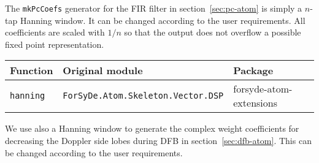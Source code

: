 \documentclass[
  a4paper,
]{article}
\newenvironment{Shaded}{}{}
\newcommand{\CommentTok}[1]{\textcolor[rgb]{0.38,0.63,0.69}{\textit{#1}}}
\newcommand{\DataTypeTok}[1]{\textcolor[rgb]{0.56,0.13,0.00}{#1}}
\newcommand{\FunctionTok}[1]{\textcolor[rgb]{0.02,0.16,0.49}{#1}}
\newcommand{\NormalTok}[1]{#1}
\newcommand{\OtherTok}[1]{\textcolor[rgb]{0.00,0.44,0.13}{#1}}
\begin{document}
The \texttt{mkPcCoefs} generator for the FIR filter in
section~\ref{sec:pc-atom} is simply a \(n\)-tap Hanning window. It can
be changed according to the user requirements. All coefficients are
scaled with \(1/n\) so that the output does not overflow a possible
fixed point representation.

\begin{Shaded}
\end{Shaded}

\begin{Shaded}
\end{Shaded}

\begin{longtable}[]{@{}lll@{}}
\toprule
Function & Original module & Package\tabularnewline
\midrule
\endhead
\texttt{hanning} & \texttt{ForSyDe.Atom.Skeleton.Vector.DSP} &
forsyde-atom-extensions\tabularnewline
\bottomrule
\end{longtable}

We use also a Hanning window to generate the complex weight coefficients
for decreasing the Doppler side lobes during DFB in
section~\ref{sec:dfb-atom}. This can be changed according to the user
requirements.

\begin{Shaded}
\end{Shaded}
\end{document}
